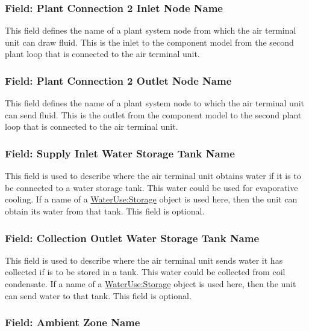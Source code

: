\subsubsection{Field: Plant Connection 2 Inlet Node Name}\label{field-plant-connection-2-inlet-node-name-1}

This field defines the name of a plant system node from which the air terminal unit can draw fluid. This is the inlet to the component model from the second plant loop that is connected to the air terminal unit.

\subsubsection{Field: Plant Connection 2 Outlet Node Name}\label{field-plant-connection-2-outlet-node-name-1}

This field defines the name of a plant system node to which the air terminal unit can send fluid. This is the outlet from the component model to the second plant loop that is connected to the air terminal unit.

\subsubsection{Field: Supply Inlet Water Storage Tank Name}\label{field-supply-inlet-water-storage-tank-name-1}

This field is used to describe where the air terminal unit obtains water if it is to be connected to a water storage tank. This water could be used for evaporative cooling. If a name of a \hyperref[waterusestorage]{WaterUse:Storage} object is used here, then the unit can obtain its water from that tank. This field is optional.

\subsubsection{Field: Collection Outlet Water Storage Tank Name}\label{field-collection-outlet-water-storage-tank-name-1}

This field is used to describe where the air terminal unit sends water it has collected if is to be stored in a tank. This water could be collected from coil condensate. If a name of a \hyperref[waterusestorage]{WaterUse:Storage} object is used here, then the unit can send water to that tank. This field is optional.

\subsubsection{Field: Ambient Zone Name}\label{field-ambient-zone-name-1}

